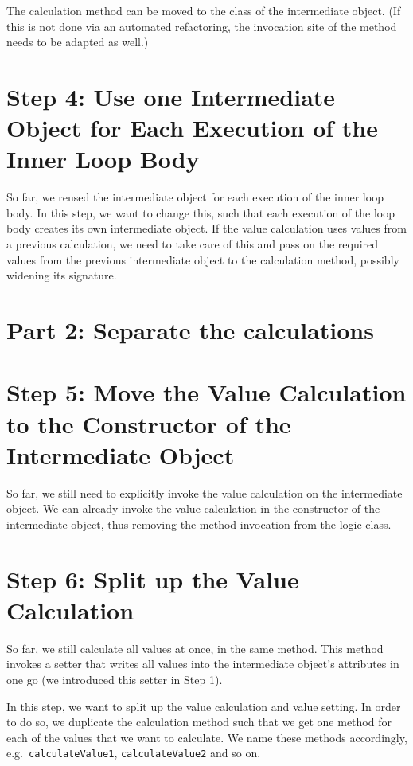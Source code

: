 \documentclass[a4paper,fleqn,titlepage,11pt]{article}
\begin{document}
The calculation method can be moved to the class of the intermediate object. (If this is not done via an automated refactoring, the invocation site of the method needs to be adapted as well.)

\section{Step 4: Use one Intermediate Object for Each Execution of the Inner Loop Body}

So far, we reused the intermediate object for each execution of the inner loop body. In this step, we want to change this, such that each execution of the loop body creates its own intermediate object. If the value calculation uses values from a previous calculation, we need to take care of this and pass on the required values from the previous intermediate object to the calculation method, possibly widening its signature.

\section{Part 2: Separate the calculations}


\section{Step 5: Move the Value Calculation to the Constructor of the Intermediate Object}

So far, we still need to explicitly invoke the value calculation on the intermediate object. We can already invoke the value calculation in the constructor of the intermediate object, thus removing the method invocation from the logic class.

\section{Step 6: Split up the Value Calculation}

So far, we still calculate all values at once, in the same method. This method invokes a setter that writes all values into the intermediate object's attributes in one go (we introduced this setter in Step 1).

In this step, we want to split up the value calculation and value setting. In order to do so, we duplicate the calculation method such that we get one method for each of the values that we want to calculate. We name these methods accordingly, e.g.~\texttt{calculateValue1}, \texttt{calculateValue2} and so on.
\end{document}
